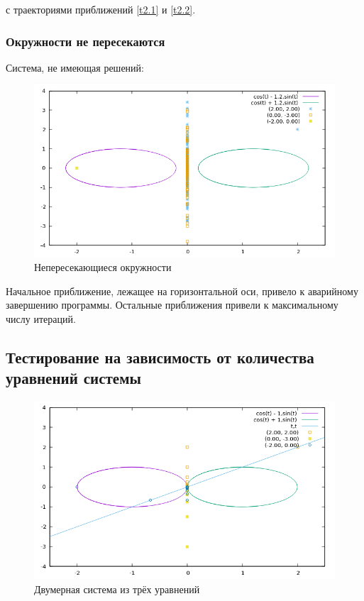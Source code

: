 \documentclass[12pt, a4paper]{article}
\begin{document}
\noindent с траекториями приближений \ref{t2.1} и \ref{t2.2}.

\subsubsection{Окружности не пересекаются}
\noindent Система, не имеющая решений:

\vspace{5mm}
\begin{figure}[H]
\centering
\includegraphics[scale=0.8]{3.png}
\caption{Непересекающиеся окружности}
\end{figure}
\vspace{5mm}

\noindent Начальное приближение, лежащее на горизонтальной оси, привело к аварийному завершению программы. Остальные
приближения привели к максимальному числу итераций.

\subsection{Тестирование на зависимость от количества уравнений системы}

\vspace{5mm}
\begin{figure}[H]
\centering
\includegraphics[scale=0.8]{4.png}
\caption{Двумерная система из трёх уравнений}
\end{figure}
\vspace{5mm}
\end{document}
